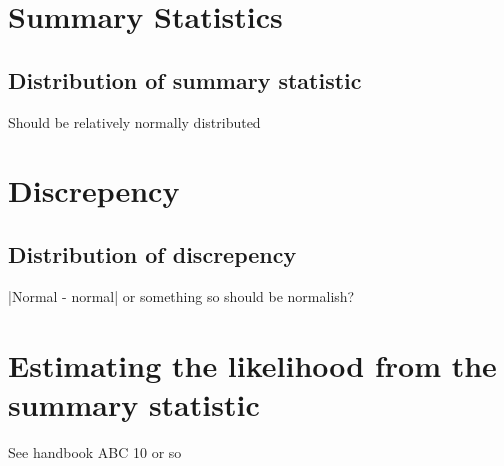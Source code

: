 \section{Summary Statistics}

\subsection*{Distribution of summary statistic}

Should be relatively normally distributed

\section{Discrepency}

\subsection*{Distribution of discrepency}

|Normal - normal| or something so should be normalish?

\section{Estimating the likelihood from the summary statistic}

See handbook ABC 10 or so